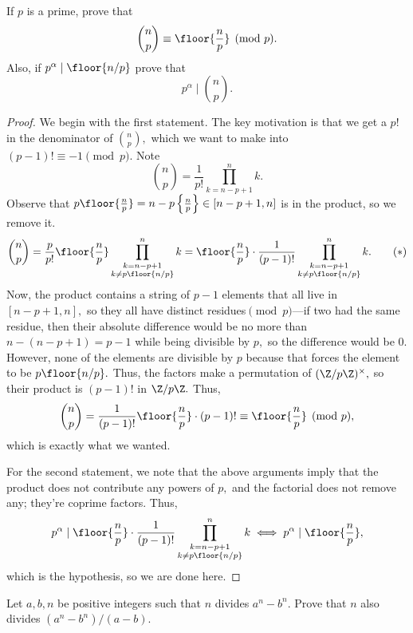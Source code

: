 \begin{exercise}[12]
If $p$ is a prime, prove that
\[\binom np\equiv\floor{\frac np}\pmod p.\]
Also, if $p^\alpha\mid\floor{n/p}$ prove that
\[p^\alpha\mid\binom np.\]
\end{exercise}

\begin{proof}
We begin with the first statement. The key motivation is that we get a $p!$ in the denominator of $\binom np,$ which we want to make into $(p-1)!\equiv-1\pmod p.$ Note
\[\binom np=\frac1{p!}\prod_{k=n-p+1}^nk.\]
Observe that $p\floor{\frac np}=n-p\left\{\frac np\right\}\in[n-p+1,n]$ is in the product, so we remove it.
\[\binom np=\frac p{p!}\floor{\frac np}\prod_{\substack{k=n-p+1\\k\ne p\floor{n/p}}}^nk=\floor{\frac np}\cdot\frac1{(p-1)!}\prod_{\substack{k=n-p+1\\k\ne p\floor{n/p}}}^nk.\tag{$*$}\]
Now, the product contains a string of $p-1$ elements that all live in $[n-p+1,n],$ so they all have distinct residues$\pmod p$---if two had the same residue, then their absolute difference would be no more than $n-(n-p+1)=p-1$ while being divisible by $p,$ so the difference would be 0. However, none of the elements are divisible by $p$ because that forces the element to be $p\floor{n/p}.$ Thus, the factors make a permutation of $(\Z/p\Z)^\times,$ so their product is $(p-1)!$ in $\Z/p\Z.$ Thus,
\[\binom np=\frac1{(p-1)!}\floor{\frac np}\cdot(p-1)!\equiv\floor{\frac np}\pmod p,\]
which is exactly what we wanted.

For the second statement, we note that the above arguments imply that the product does not contribute any powers of $p,$ and the factorial does not remove any; they're coprime factors. Thus,
\[p^\alpha\mid\floor{\frac np}\cdot\frac1{(p-1)!}\prod_{\substack{k=n-p+1\\k\ne p\floor{n/p}}}^nk\iff p^\alpha\mid\floor{\frac np},\]
which is the hypothesis, so we are done here.
\end{proof}

\begin{exercise}
Let $a,b,n$ be positive integers such that $n$ divides $a^n-b^n.$ Prove that $n$ also divides $\left(a^n-b^n\right)/(a-b).$
\end{exercise}

